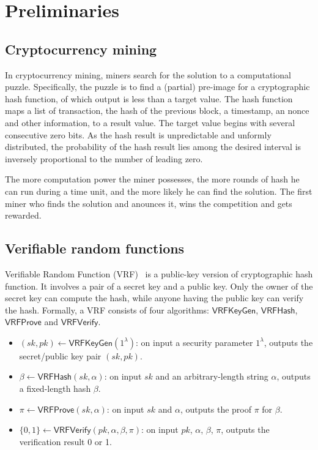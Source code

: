 \section{Preliminaries}

\subsection{Cryptocurrency mining}

In cryptocurrency mining, miners search for the solution to a computational puzzle.
Specifically, the puzzle is to find a (partial) pre-image for a cryptographic hash function, of which output is less than a target value.
The hash function maps a list of transaction, the hash of the previous block, a timestamp, an nonce and other information, to a result value.
The target value begins with several consecutive zero bits.
As the hash result is unpredictable and unformly distributed, the probability of the hash result lies among the desired interval is inversely proportional to the number of leading zero.

The more computation power the miner possesses, the more rounds of hash he can run during a time unit, and the more likely he can find the solution. The first miner who finds the solution and anounces it, wins the competition and gets rewarded.

\subsection{Verifiable random functions}

Verifiable Random Function (VRF)~\cite{micali1999verifiable} is a public-key version of cryptographic hash function.
It involves a pair of a secret key and a public key.
Only the owner of the secret key can compute the hash, while anyone having the public key can verify the hash.
Formally, a VRF consists of four algorithms: $\mathsf{VRFKeyGen}$, $\mathsf{VRFHash}$, $\mathsf{VRFProve}$ and $\mathsf{VRFVerify}$.

\begin{itemize}
    \item $(sk, pk) \gets \mathsf{VRFKeyGen}(1^{\lambda})$: on input a security parameter $1^{\lambda}$, outputs the secret/public key pair $(sk, pk)$.
    \item $\beta \gets \mathsf{VRFHash}(sk, \alpha)$: on input $sk$ and an arbitrary-length string $\alpha$, outputs a fixed-length hash $\beta$.
    \item $\pi \gets \mathsf{VRFProve}(sk, \alpha)$: on input $sk$ and $\alpha$, outputs the proof $\pi$ for $\beta$.
    \item $\{0, 1\} \gets \mathsf{VRFVerify}(pk, \alpha, \beta, \pi)$: on input $pk$, $\alpha$, $\beta$, $\pi$, outputs the verification result 0 or 1.
\end{itemize}

